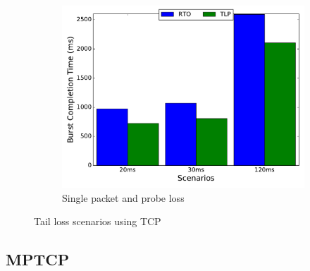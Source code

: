 \documentclass[10pt,conference,compsoc]{IEEEtran}
\begin{document}
\begin{figure}[!tbp]
\begin{subfigure}[b]{0.32\textwidth}
	\includegraphics[angle=0, width=\textwidth, natwidth=578.16,natheight=433.62]{plots/T1PP.pdf}
	\caption{Single packet and probe loss }\label{t1pp}
 \end{subfigure}
 \caption{Tail loss scenarios using TCP}\label{tcpf}
\end{figure}
\subsection{MPTCP}
\end{document}
